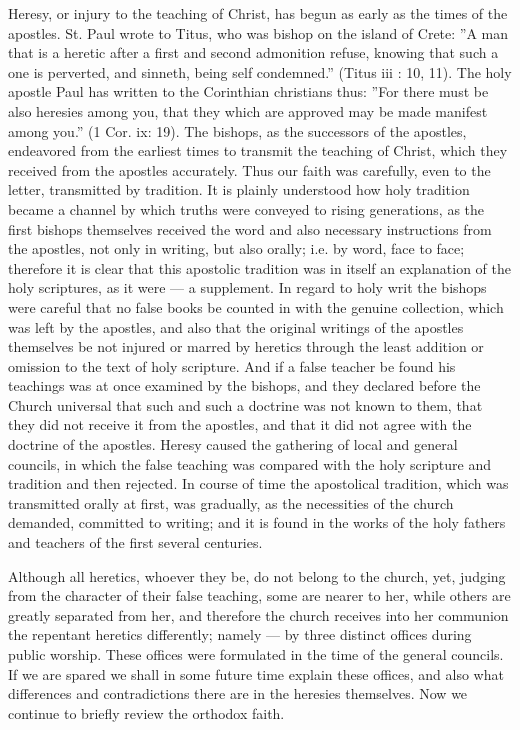 Heresy, or injury to the teaching of Christ, 
has begun as early as the times of the apostles. 
St. Paul wrote to Titus, who was bishop on the 
island of Crete: ''A man that is a heretic after 
a first and second admonition refuse, knowing 
that such a one is perverted, and sinneth, being
self condemned.'' (Titus iii : 10, 11). The holy 
apostle Paul has written to the Corinthian 
christians thus: ''For there must be also heresies
among you, that they which are approved 
may be made manifest among you.'' (1 Cor. ix: 
19). The bishops, as the successors of the 
apostles, endeavored from the earliest times to 
transmit the teaching of Christ, which they received
from the apostles accurately. Thus our 
faith was carefully, even to the letter, transmitted
by tradition. It is plainly understood 
how holy tradition became a channel by which 
truths were conveyed to rising generations, as 
the first bishops themselves received the word 
and also necessary instructions from the 
apostles, not only in writing, but also orally; 
i.e. by word, face to face; therefore it is clear 
that this apostolic tradition was in itself an explanation
of the holy scriptures, as it were — a 
supplement. In regard to holy writ the bishops 
were careful that no false books be counted in 
with the genuine collection, which was left by 
the apostles, and also that the original writings 
of the apostles themselves be not injured or 
marred by heretics through the least addition or 
omission to the text of holy scripture. And 
if a false teacher be found his teachings was at
once examined by the bishops, and they declared
before the Church universal that such and 
such a doctrine was not known to them, that 
they did not receive it from the apostles, and 
that it did not agree with the doctrine of the 
apostles. Heresy caused the gathering of local 
and general councils, in which the false teaching
was compared with the holy scripture and 
tradition and then rejected. In course of time 
the apostolical tradition, which was transmitted 
orally at first, was gradually, as the necessities 
of the church demanded, committed to writing; 
and it is found in the works of the holy fathers 
and teachers of the first several centuries. 

Although all heretics, whoever they be, do not 
belong to the church, yet, judging from the 
character of their false teaching, some are nearer 
to her, while others are greatly separated from 
her, and therefore the church receives into her 
communion the repentant heretics differently; 
namely — by three distinct offices during public 
worship. These offices were formulated in the 
time of the general councils. If we are spared 
we shall in some future time explain these offices,
and also what differences and contradictions
there are in the heresies themselves. Now 
we continue to briefly review the orthodox faith.

